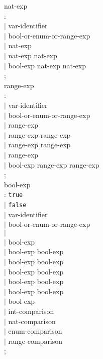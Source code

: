 \begin{tab}
\begin{tabbing}
nat-exp \\
\>: \NATNUM  \\
\>$|$ var-identifier \\
\>$|$ \ARRAYORBITVECID\LSQBRAC bool-or-enum-or-range-exp \RSQBRAC \\
\>$|$ \LPARA nat-exp \RPARA \\
\>$|$ nat-exp \PLUS nat-exp \\
\>$|$ \IF bool-exp \THEN nat-exp \ELSE nat-exp \FI \\
\>; \\

range-exp \\
\>: \NATNUM  \\
\>$|$ var-identifier \\
\>$|$ \ARRAYORBITVECID\LSQBRAC bool-or-enum-or-range-exp \RSQBRAC \\
\>$|$ \LPARA range-exp \RPARA \\
\>$|$ range-exp \PLUS range-exp \\
\>$|$ range-exp \MINUS range-exp \\
\>$|$ \MINUS range-exp \\
\>$|$ \IF bool-exp \THEN range-exp \ELSE range-exp \FI \\
\>; \\


bool-exp \\
\>: {\tt true} \\
\>$|$ {\tt false} \\
\>$|$ var-identifier \\
\>$|$ \ARRAYORBITVECID \LSQBRAC bool-or-enum-or-range-exp \RSQBRAC \\
\>$|$ \EVENTQUERY  \\
\>$|$ \LPARA bool-exp \RPARA \\
\>$|$ bool-exp \AMPERSAND bool-exp \\
\>$|$ bool-exp \VERTBAR bool-exp \\
\>$|$ bool-exp \IMPLY bool-exp \\
\>$|$ bool-exp \EQUIV bool-exp \\
\>$|$ bool-exp \EQ bool-exp \\
\>$|$ \TILDE bool-exp \\
\>$|$ int-comparison \\
\>$|$ nat-comparison \\
\>$|$ enum-comparison \\
\>$|$ range-comparison \\
\>; \\


\end{tabbing}
\end{tab}
